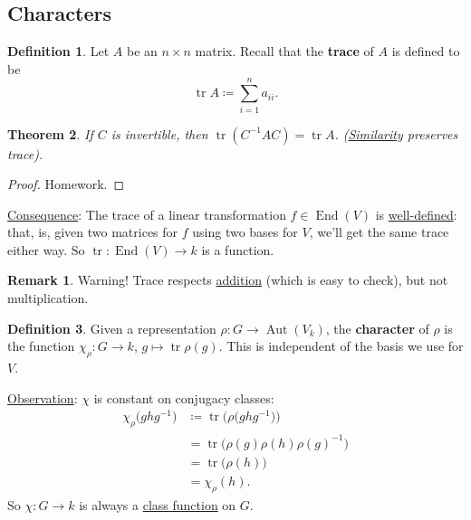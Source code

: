 \documentclass[12pt]{article}
\newcommand\inv[1]{#1^{-1}}
\newtheorem{theorem}{Theorem}[section]
\theoremstyle{definition}
\newtheorem{definition}[theorem]{Definition}
\newtheorem*{remark}{Remark}
\DeclareMathOperator\Aut{Aut}
\DeclareMathOperator\End{End}
\DeclareMathOperator\tr{tr}
\begin{document}
\subsection{Characters}
\begin{definition}
    Let $A$ be an $n \times n$ matrix. Recall that the \textbf{trace} of $A$ is defined to be 
    \begin{equation}
        \tr A \coloneqq  \sum\limits_{i=1}^n a_{ii}.
    \end{equation}
\end{definition}
\begin{theorem}
    If $C$ is invertible, then $\tr(\inv{C} A C) = \tr A$. (\underline{Similarity} preserves trace).
\end{theorem}
\begin{proof}
    Homework.
\end{proof}
\noindent \underline{Consequence}: The trace of a linear transformation $f \in \End(V)$ is \underline{well-defined}: that, is, given two matrices for $f$ using two bases for $V$, we'll get the same trace either way. So $\tr : \End(V) \to k$ is a function.
\begin{remark}
    Warning! Trace respects \underline{addition} (which is easy to check), but not multiplication.
\end{remark}
\begin{definition}
    Given a representation $\rho : G \to \Aut(V_k)$, the \textbf{character} of $\rho$ is the function $\chi_{\rho} : G \to k$, $g \mapsto \tr \rho(g)$. This is independent of the basis we use for $V$.
\end{definition}
\noindent \underline{Observation}: $\chi$ is constant on conjugacy classes: 
\begin{equation}
    \begin{split}
        \chi_{\rho} \big( g h \inv{g} \big) & \coloneqq  \tr \Big( \rho \big( g h \inv{g} \big)  \Big) \\
        & = \tr \big( \rho(g) \rho(h) \inv{\rho(g)} \big) \\
        & = \tr \big( \rho(h) \big) \\
        & = \chi_{\rho} (h).
    \end{split}
\end{equation}
So $\chi : G \to k$ is always a \underline{class function} on $G$.
\end{document}
